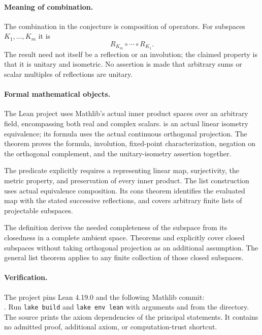 \documentclass[11pt]{article}
\begin{document}
\paragraph{Meaning of combination.}
The combination in the conjecture is composition of operators. For subspaces $K_1,\ldots,K_m$ it is
\[
 R_{K_m}\circ\cdots\circ R_{K_1}.
\]
The result need not itself be a reflection or an involution; the claimed property is that it is unitary and isometric. No assertion is made that arbitrary sums or scalar multiples of reflections are unitary.

\paragraph{Formal mathematical objects.}
The Lean project uses Mathlib's actual inner product spaces over an arbitrary  field, encompassing both real and complex scalars.  is an actual linear isometry equivalence; its formula uses the actual continuous orthogonal projection. The theorem  proves the formula, involution, fixed-point characterization, negation on the orthogonal complement, and the unitary-isometry assertion together.

The predicate  explicitly requires a representing linear map, surjectivity, the metric  property, and preservation of every inner product. The list construction  uses actual equivalence composition. Its cons theorem identifies the evaluated map with the stated successive reflections, and  covers arbitrary finite lists of projectable subspaces.

The definition  derives the needed completeness of the subspace from its closedness in a complete ambient space. Theorems  and  explicitly cover closed subspaces without taking orthogonal projection as an additional assumption. The general list theorem applies to any finite collection of those closed subspaces.

\paragraph{Verification.}
The project pins Lean 4.19.0 and the following Mathlib commit:\\
.
Run \texttt{lake build} and \texttt{lake env lean} with arguments  and  from the  directory. The source prints the axiom dependencies of the principal statements. It contains no admitted proof, additional axiom, or computation-trust shortcut.
\end{document}
